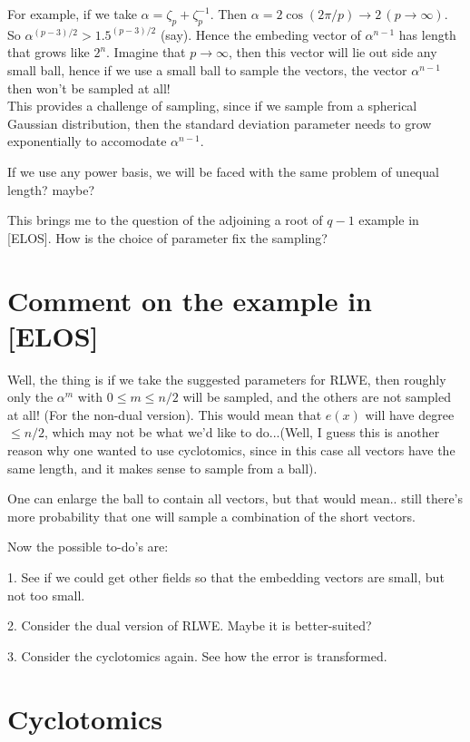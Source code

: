 \documentclass{amsart}
\begin{document}
For example, if we take $\alpha = \zeta_p + \zeta_p^{-1}$. Then $\alpha = 2\cos(2\pi/p) \to 2 \, (p \to \infty)$. So
$\alpha^{(p-3)/2} >  1.5^{(p-3)/2}$ (say). Hence the embeding vector of $\alpha^{n-1}$ has length that grows like $2^n$. Imagine that $p \to \infty$, then this vector will lie out side any small ball, hence if we use a small ball to sample the vectors, the vector $\alpha^{n-1}$ then won't be sampled
at all! \\

This provides a challenge of sampling, since if we sample from a spherical Gaussian distribution, then the standard deviation parameter needs to grow exponentially to accomodate $\alpha^{n-1}$.

If we use any power basis, we will be faced with the same
problem of unequal length? maybe?

This brings me to the question of the adjoining a root of $q-1$ example in [ELOS]. How is the choice of parameter fix the sampling?

\section{Comment on the example in [ELOS]}

Well, the thing is if we take the suggested parameters for
RLWE, then roughly only the $\alpha^{m}$ with $0 \leq m \leq n/2$ will be sampled, and the others are not sampled at all! (For the non-dual version). This would mean that $e(x)$ will have degree $\leq n/2$, which may not be what we'd like to do...(Well, I guess this is another reason why one wanted to use cyclotomics, since in this case all vectors have the same length, and it makes sense to sample from a ball).

One can enlarge the ball to contain all vectors, but that would mean.. still there's more probability that one will sample a combination of the short vectors.

Now the possible to-do's are:

1. See if we could get other fields so that the embedding vectors are small, but not too small.

2. Consider the dual version of RLWE. Maybe it is better-suited?

3. Consider the cyclotomics again. See how the error is transformed.



\section{Cyclotomics}
\end{document}
